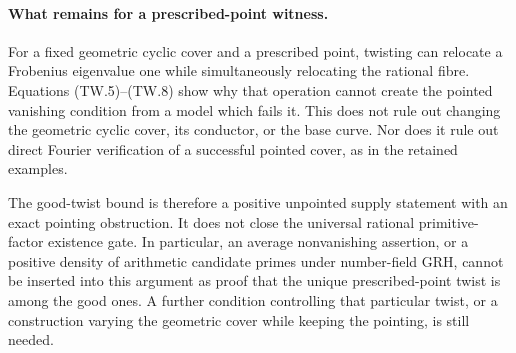\paragraph{What remains for a prescribed-point witness.}
For a fixed geometric cyclic cover and a prescribed point,
twisting can relocate a Frobenius eigenvalue one while
simultaneously relocating the rational fibre. Equations
(TW.5)--(TW.8) show why that operation cannot create the
pointed vanishing condition from a model which fails it.
This does not rule out changing the geometric cyclic cover,
its conductor, or the base curve. Nor does it rule out direct
Fourier verification of a successful pointed cover, as in the
retained examples.

The good-twist bound is therefore a positive unpointed supply
statement with an exact pointing obstruction. It does not
close the universal rational primitive-factor existence gate.
In particular, an average nonvanishing assertion, or a positive
density of arithmetic candidate primes under number-field
GRH, cannot be inserted into this argument as proof that the
unique prescribed-point twist is among the good ones.
A further condition controlling that particular twist, or a
construction varying the geometric cover while keeping the
pointing, is still needed.
